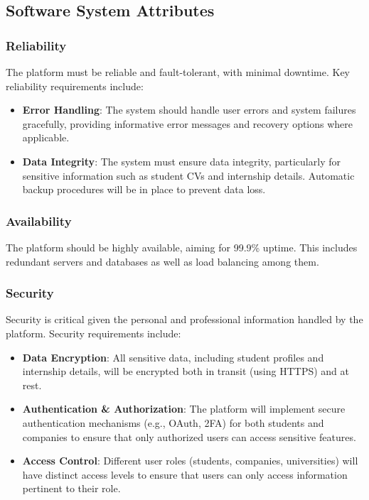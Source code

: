 \subsection{Software System Attributes}

\subsubsection{Reliability}
The platform must be reliable and fault-tolerant, with minimal downtime. Key reliability requirements include:
\begin{itemize}
  \item \textbf{Error Handling}: The system should handle user errors and system failures gracefully, providing informative error messages and recovery options where applicable.
  \item \textbf{Data Integrity}: The system must ensure data integrity, particularly for sensitive information such as student CVs and internship details. Automatic backup procedures will be in place to prevent data loss.
\end{itemize}

\subsubsection{Availability}
The platform should be highly available, aiming for 99.9\% uptime. This includes redundant servers and databases as well as load balancing among them.


\subsubsection{Security}
Security is critical given the personal and professional information handled by the platform. Security requirements include:
\begin{itemize}
  \item \textbf{Data Encryption}: All sensitive data, including student profiles and internship details, will be encrypted both in transit (using HTTPS) and at rest.
  \item \textbf{Authentication \& Authorization}: The platform will implement secure authentication mechanisms (e.g., OAuth, 2FA) for both students and companies to ensure that only authorized users can access sensitive features.
  \item \textbf{Access Control}: Different user roles (students, companies, universities) will have distinct access levels to ensure that users can only access information pertinent to their role.
\end{itemize}

